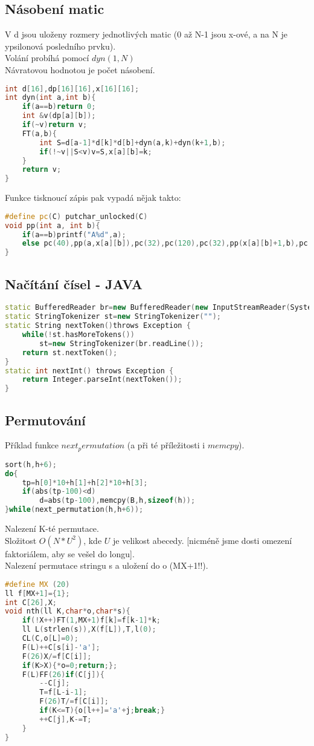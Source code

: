\documentclass[11pt]{article}
\begin{document}
\subsection{Násobení matic}
V \textsf{d} jsou uloženy rozmery jednotlivých matic (0 až N-1 jsou x-ové, a na N je ypsilonová posledního prvku).
\\Volání probíhá pomocí $dyn(1,N)$
\\Návratovou hodnotou je počet násobení.
\begin{lstlisting}[language=C++]
int d[16],dp[16][16],x[16][16];
int dyn(int a,int b){
    if(a==b)return 0;
    int &v(dp[a][b]);
    if(~v)return v;
    FT(a,b){
        int S=d[a-1]*d[k]*d[b]+dyn(a,k)+dyn(k+1,b);
        if(!~v||S<v)v=S,x[a][b]=k;
    }
    return v;
}
\end{lstlisting}
Funkce tisknoucí zápis pak vypadá nějak takto:
\begin{lstlisting}[language=C++]
#define pc(C) putchar_unlocked(C)
void pp(int a, int b){
    if(a==b)printf("A%d",a);
    else pc(40),pp(a,x[a][b]),pc(32),pc(120),pc(32),pp(x[a][b]+1,b),pc(41);
}
\end{lstlisting}
\subsection{Načítání čísel - JAVA}
\begin{lstlisting}[language=C++]
static BufferedReader br=new BufferedReader(new InputStreamReader(System.in));
static StringTokenizer st=new StringTokenizer("");
static String nextToken()throws Exception {
    while(!st.hasMoreTokens())
        st=new StringTokenizer(br.readLine());
    return st.nextToken();
}
static int nextInt() throws Exception {
    return Integer.parseInt(nextToken());
}
\end{lstlisting}
\subsection{Permutování}
Příklad funkce $next_permutation$ (a při té příležitosti i $memcpy$).
\begin{lstlisting}[language=C++]
sort(h,h+6);
do{
    tp=h[0]*10+h[1]+h[2]*10+h[3];
    if(abs(tp-100)<d)
        d=abs(tp-100),memcpy(B,h,sizeof(h));
}while(next_permutation(h,h+6));
\end{lstlisting}
Nalezení K-té permutace.
\\Složitost $O(N*U^2)$, kde $U$ je velikost abecedy. [nicméně jsme dosti omezení faktoriálem, aby se vešel do longu].
\\Nalezení permutace stringu \textsf{s} a uložení do \textsf{o} (MX+1!!).
\begin{lstlisting}[language=C++]
#define MX (20)
ll f[MX+1]={1};
int C[26],X;
void nth(ll K,char*o,char*s){
    if(!X++)FT(1,MX+1)f[k]=f[k-1]*k;
    ll L(strlen(s)),X(f[L]),T,l(0);
    CL(C,o[L]=0);
    F(L)++C[s[i]-'a'];
    F(26)X/=f[C[i]];
    if(K>X){*o=0;return;};
    F(L)FF(26)if(C[j]){
        --C[j];
        T=f[L-i-1];
        F(26)T/=f[C[i]];
        if(K<=T){o[l++]='a'+j;break;}
        ++C[j],K-=T;
    }
}
\end{lstlisting}
\end{document}
